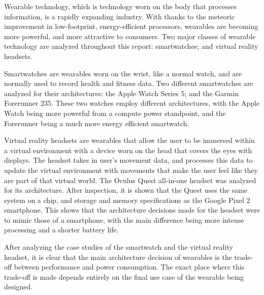 Wearable technology, which is technology worn on the body that processes information,
is a rapidly expanding industry. With thanks to the meteoric improvement in
low-footprint, energy-efficient processors, wearables are becoming more powerful,
and more attractive to consumers. Two major classes of wearable technology are analyzed
throughout this report: smartwatches; and virtual reality headsets.

Smartwatches are wearables worn on the wrist, like a normal watch, and are normally
used to record health and fitness data. Two different smartwatches are analyzed
for their architectures: the Apple Watch Series 5; and the Garmin Forerunner 235.
These two watches employ different architectures, with the Apple Watch being more
powerful from a compute power standpoint, and the Forerunner being a much more energy
efficient smartwatch.

Virtual reality headsets are wearables that allow the user to be immersed within a
virtual environment with a device worn on the head that covers the eyes with displays.
The headset takes in user's movement data, and processes this data to update the virtual
environment with movements that make the user feel like they are part of that virtual
world. The Oculus Quest all-in-one headset was analyzed for its architecture. After
inspection, it is shown that the Quest uses the same system on a chip, and storage
and memory specifications as the Google Pixel 2 smartphone. This shows that the
architecture decisions made for the headset were to mimic those of a smartphone, with
the main difference being more intense processing and a shorter battery life.

After analyzing the case studies of the smartwatch and the virtual reality headset,
it is clear that the main architecture decision of wearables is the trade-off between
performance and power consumption. The exact place where this trade-off is made depends
entirely on the final use case of the wearable being designed.